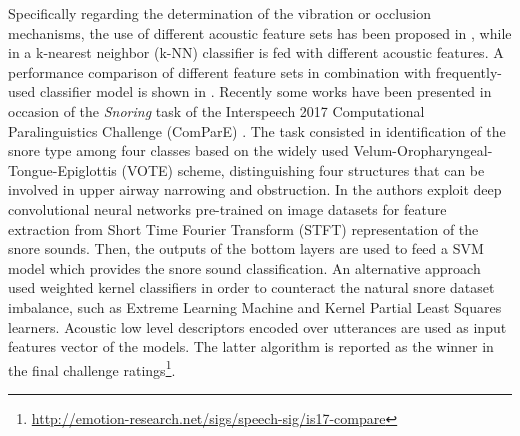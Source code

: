 Specifically regarding the determination of the vibration or occlusion mechanisms, the use of different acoustic feature sets has been proposed in \cite{janott2014akustical}, while in \cite{qian2015automatic} a k-nearest neighbor (k-NN) classifier is fed with different acoustic features. A performance comparison of different feature sets in combination with frequently-used classifier model is shown in \cite{qian2016classification}. 
Recently some works have been presented in occasion of the \textit{Snoring} task of the Interspeech 2017 Computational Paralinguistics Challenge (ComParE) \cite{ComParE2017}. The task consisted in identification of the snore type among four classes based on the widely used Velum-Oropharyngeal-Tongue-Epiglottis (VOTE) scheme, distinguishing four structures that can be involved in upper airway narrowing and obstruction. In  \cite{amiriparian2017snore, freitag2017end} the authors exploit deep convolutional neural networks pre-trained on image datasets for feature extraction from Short Time Fourier Transform (STFT) representation of the snore sounds. Then, the outputs of the bottom layers are used to feed a SVM model which provides the snore sound classification.
An alternative approach used weighted kernel classifiers \cite{kaya2017introducing} in order to counteract the natural snore dataset imbalance, such as Extreme Learning Machine and Kernel Partial Least Squares learners. Acoustic low level descriptors encoded over utterances are used as input features vector of the models. The latter algorithm is reported as the winner in the final challenge ratings\footnote{\url{http://emotion-research.net/sigs/speech-sig/is17-compare}}.


